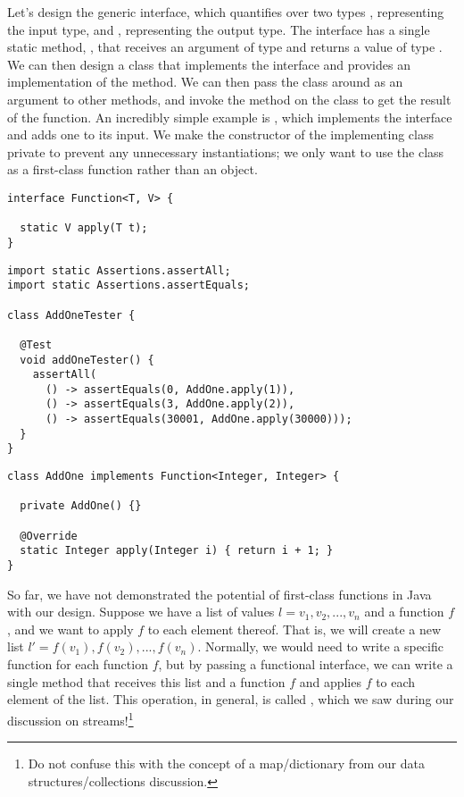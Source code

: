 Let's design the generic  interface, which quantifies over two types , representing the input type, and , representing the output type. The  interface has a single static method, , that receives an argument of type  and returns a value of type . We can then design a class that implements the  interface and provides an implementation of the  method. We can then pass the class around as an argument to other methods, and invoke the  method on the class to get the result of the function. An incredibly simple example is , which implements the  interface and adds one to its input. We make the constructor of the implementing class private to prevent any unnecessary instantiations; we only want to use the class as a first-class function rather than an object.

\begin{lstlisting}[language=MyJava]
interface Function<T, V> {

  static V apply(T t); 
}
\end{lstlisting}

\begin{lstlisting}[language=MyJava]
import static Assertions.assertAll;
import static Assertions.assertEquals;

class AddOneTester {

  @Test
  void addOneTester() {
    assertAll(
      () -> assertEquals(0, AddOne.apply(1)),
      () -> assertEquals(3, AddOne.apply(2)),
      () -> assertEquals(30001, AddOne.apply(30000)));
  }
}
\end{lstlisting}
\begin{lstlisting}[language=MyJava]
class AddOne implements Function<Integer, Integer> {

  private AddOne() {}

  @Override
  static Integer apply(Integer i) { return i + 1; }
}
\end{lstlisting}

So far, we have not demonstrated the potential of first-class functions in Java with our design. Suppose we have a list of  values $l=v_1, v_2, ..., v_n$ and a function $f$, and we want to apply $f$ to each element thereof. That is, we will create a new list $l'=f(v_1), f(v_2), ..., f(v_n)$. Normally, we would need to write a specific function for each function $f$, but by passing a functional interface, we can write a single method that receives this list and a function $f$ and applies $f$ to each element of the list. This operation, in general, is called , which we saw during our discussion on streams!\footnote{Do not confuse this with the concept of a map/dictionary from our data structures/collections discussion.}

